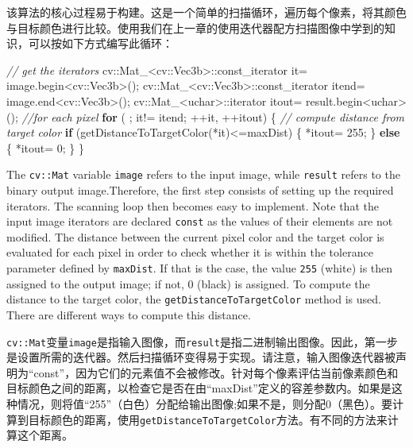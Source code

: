 \documentclass[]{article}
\newenvironment{Shaded}{}{}
\newcommand{\CommentTok}[1]{\textcolor[rgb]{0.38,0.63,0.69}{\textit{#1}}}
\newcommand{\ControlFlowTok}[1]{\textcolor[rgb]{0.00,0.44,0.13}{\textbf{#1}}}
\newcommand{\DecValTok}[1]{\textcolor[rgb]{0.25,0.63,0.44}{#1}}
\newcommand{\ExtensionTok}[1]{#1}
\newcommand{\NormalTok}[1]{#1}
\begin{document}
该算法的核心过程易于构建。这是一个简单的扫描循环，遍历每个像素，将其颜色与目标颜色进行比较。使用我们在上一章的使用迭代器配方扫描图像中学到的知识，可以按如下方式编写此循环：

\begin{Shaded}
\begin{Highlighting}[]
\CommentTok{// get the iterators}
\NormalTok{cv::Mat_<cv::Vec3b>::const_iterator it= image.begin<cv::Vec3b>();}
\NormalTok{cv::Mat_<cv::Vec3b>::const_iterator itend= image.end<cv::Vec3b>();}
\NormalTok{cv::Mat_<}\ExtensionTok{uchar}\NormalTok{>::iterator itout= result.begin<}\ExtensionTok{uchar}\NormalTok{>();}
\CommentTok{//for each pixel}
\ControlFlowTok{for}\NormalTok{ ( ; it!= itend; ++it, ++itout) \{}
    \CommentTok{// compute distance from target color}
    \ControlFlowTok{if}\NormalTok{ (getDistanceToTargetColor(*it)<=maxDist) \{}
\NormalTok{    	*itout= }\DecValTok{255}\NormalTok{;}
\NormalTok{    \} }\ControlFlowTok{else}\NormalTok{ \{}
\NormalTok{    	*itout= }\DecValTok{0}\NormalTok{;}
\NormalTok{    \}}
\NormalTok{\}}
\end{Highlighting}
\end{Shaded}

The \texttt{cv::Mat} variable \texttt{image} refers to the input image,
while \texttt{result} refers to the binary output image.Therefore, the
first step consists of setting up the required iterators. The scanning
loop then becomes easy to implement. Note that the input image iterators
are declared \texttt{const} as the values of their elements are not
modified. The distance between the current pixel color and the target
color is evaluated for each pixel in order to check whether it is within
the tolerance parameter defined by \texttt{maxDist}. If that is the
case, the value \texttt{255} (white) is then assigned to the output
image; if not, 0 (black) is assigned. To compute the distance to the
target color, the \texttt{getDistanceToTargetColor} method is used.
There are different ways to compute this distance.

\texttt{cv::Mat}变量\texttt{image}是指输入图像，而\texttt{result}是指二进制输出图像。因此，第一步是设置所需的迭代器。然后扫描循环变得易于实现。请注意，输入图像迭代器被声明为``const''，因为它们的元素值不会被修改。针对每个像素评估当前像素颜色和目标颜色之间的距离，以检查它是否在由``maxDist''定义的容差参数内。如果是这种情况，则将值``255''（白色）分配给输出图像;如果不是，则分配0（黑色）。要计算到目标颜色的距离，使用\texttt{getDistanceToTargetColor}方法。有不同的方法来计算这个距离。
\end{document}
